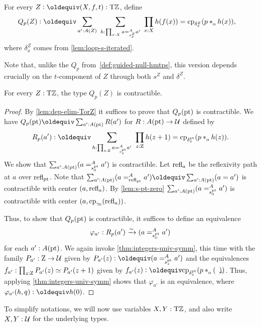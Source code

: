 \documentclass[a4paper,12pt]{amsart}
\begin{document}
\begin{definition}\label{def:guided-null-hmtps-dep}
For every $Z\defeq(X,f,t):\TorZ$, define
\begin{align*}\label{eq:TBD}
Q_p(Z)&\defeq \sum_{a' : A(Z)}~\sum_{h : \prod_{x:X} a =^A_{s^Z_x} a'}~\prod_{x:X} h(f(x)) = \cp{\delta^Z_x}(p\cto h(x)),
\end{align*}
where $\delta^Z_x$ comes from \cref{lem:loop-s-iterated}.
\end{definition}
Note that, unlike the $Q_p$ from~\cref{def:guided-null-hmtps},
this version depends crucially on the $t$-component of $Z$ through
both $s^Z$ and $\delta^Z$.

\begin{lemma}\label{lem:guided-null-hmtps-dep}
  For every $Z:{\mathrm{T}\mathbb{Z}}$, the type $Q_p(Z)$ is contractible.
\end{lemma}
\begin{proof}
  By \cref{lem:dep-elim-TorZ} it suffices to prove that $Q_p({\mathord{\mathrm{pt}}})$ is contractible.
  We have $Q_p(\pt)\jdeq \sum_{a':A(\pt)} R(a')$ for $R : A({\mathord{\mathrm{pt}}}) \to \mathcal{U}$ defined by
  \[
    R_p(a') \defeq \sum_{h : \prod_{z:\zet} a =^A_{s^\pt_z} a'}~
    \prod_{z:\zet} h(z+1) = \cp{\delta^\pt_z}(p \cto h(z)).
  \]
  We show that $\sum_{a':A({\mathord{\mathrm{pt}}})} (a =^A_{s^{\mathord{\mathrm{pt}}}_0} {a'})$ is contractible.
  Let $\mathop{{\mathrm{refl}}_{a}}$ be the reflexivity path at $a$ over $\mathop{{\mathrm{refl}}_{{\mathord{\mathrm{pt}}}}}$.
  Note that $\sum_{a':A(\pt)} (a =^A_{\refl{\pt}} a') \jdeq \sum_{a':A(\pt)} (a = a')$
  is contractible with center $(a,\mathop{{\mathrm{refl}}_{a}})$. By \cref{lem:s-pt-zero}
  $\sum_{a':A({\mathord{\mathrm{pt}}})} (a =^A_{s^{\mathord{\mathrm{pt}}}_0} {a'})$ is contractible with center
  $(a,\mathrm{cp}_{\gamma_0}(\mathop{{\mathrm{refl}}_{a}}))$.

  Thus, to show that $Q_p({\mathord{\mathrm{pt}}})$ is contractible,
  it suffices to define an equivalence
  \[
    \varphi_{a'} : R_p(a') \xrightarrow{\sim}{} (a =^A_{s^{\mathord{\mathrm{pt}}}_0} {a'})
  \]
  for each $a' : A({\mathord{\mathrm{pt}}})$.
  We again invoke \cref{thm:integers-univ-symm},
  this time with the family $P_{a'} : \mathrm{Z} \to \mathcal{U}$ given
  by $P_{a'}(z) \defeq (a =^A_{s^\pt_z} {a'})$
  and the equivalences $f_{a'} : \prod_{z:\mathrm{Z}} P_{a'}(z)\simeq P_{a'}(z+1)$
  given by $f_{a'}(z) \defeq \cp{\delta^\pt_z}(p \cto (\blank))$.
  Thus, applying \cref{thm:integers-univ-symm}
  shows that $\varphi_{a'}$ is an equivalence,
  where $\varphi_{a'}(h,q) \defeq h(0)$.
\end{proof}

To simplify notations, we will now use variables $X,Y:{\mathrm{T}\mathbb{Z}}$,
and also write $X,Y:\mathcal{U}$ for the underlying types.
\end{document}
